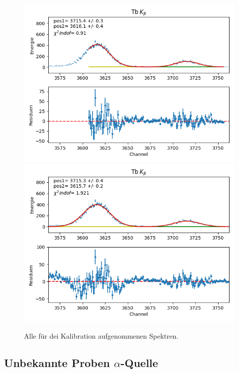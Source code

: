 \documentclass[12pt,a4paper]{article}
\begin{document}
\begin{figure}[H]
\centering
\includegraphics[scale=0.8]{Bilder/alpha/tb_beta_1.png}
\includegraphics[scale=0.8]{Bilder/alpha/tb_beta_2.png}
\caption{Alle für dei Kalibration aufgenommenen Spektren.}
\label{fig:kal_alles}
\end{figure}
\subsection{Unbekannte Proben $\alpha$-Quelle}
\end{document}

